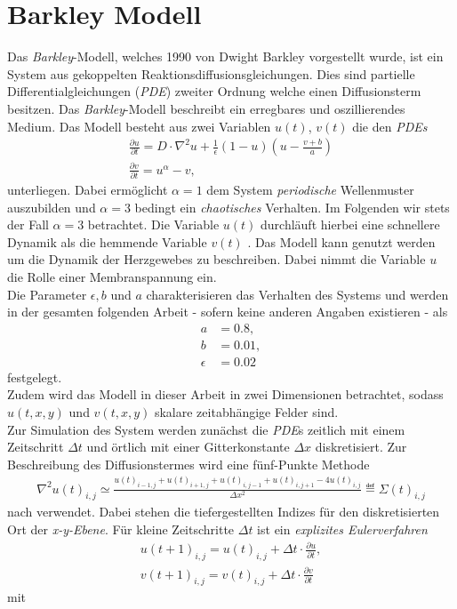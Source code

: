 \section{Barkley Modell}
Das \textit{Barkley}-Modell, welches 1990 von Dwight Barkley vorgestellt wurde, ist ein System aus gekoppelten Reaktionsdiffusionsgleichungen. Dies sind partielle Differentialgleichungen (\textit{PDE}) zweiter Ordnung welche einen Diffusionsterm besitzen. Das \textit{Barkley}-Modell beschreibt ein erregbares und oszillierendes Medium. Das Modell besteht aus zwei Variablen $u(t)$, $v(t)$ die den  \textit{PDEs}
\begin{equation}
\begin{gathered}
\frac{\partial u}{\partial t} = D \cdot \nabla^2 u + \frac{1}{\epsilon} (1-u) \left(u-\frac{v+b}{a}\right)\\
\frac{\partial v}{\partial t} = u^\alpha-v,
\end{gathered}
\end{equation}
unterliegen. Dabei ermöglicht $\alpha=1$ dem System \textit{periodische} Wellenmuster auszubilden und $\alpha=3$ bedingt ein \textit{chaotisches} Verhalten. Im Folgenden wir stets der Fall $\alpha=3$ betrachtet. Die Variable $u(t)$ durchläuft hierbei eine schnellere Dynamik als die hemmende Variable $v(t)$ \citep{Barkley:2008, berg2011synchronization}. Das Modell kann genutzt werden um die Dynamik der Herzgewebes zu beschreiben. Dabei nimmt die Variable $u$ die Rolle einer Membranspannung ein.\\
Die Parameter $\epsilon, b$ und $a$ charakterisieren das Verhalten des Systems und werden in der gesamten folgenden Arbeit - sofern keine anderen Angaben existieren - als
\begin{align*}
a &= 0.8,\\ b &= 0.01,\\ \epsilon &= 0.02
\end{align*}
festgelegt.\\
Zudem wird das Modell in dieser Arbeit in zwei Dimensionen betrachtet, sodass $u(t, x,y)$ und $v(t, x,y)$ skalare zeitabhängige Felder sind.\\
Zur Simulation des System werden zunächst die \textit{PDE}s zeitlich mit einem Zeitschritt $\Delta t$ und örtlich mit einer Gitterkonstante $\Delta x$ diskretisiert. Zur Beschreibung des Diffusionstermes wird eine fünf-Punkte Methode
\begin{align}
\nabla^2 u(t)_{i,j} \simeq \frac{u(t)_{i-1, j} + u(t)_{i+1,j} + u(t)_{i,j-1} + u(t)_{i,j+1} - 4 u(t)_{i,j}}{\Delta x^2} \eqdef \Sigma(t)_{i,j}
\end{align} 
nach \citep{Barkley:2008} verwendet. Dabei stehen die tiefergestellten Indizes für den diskretisierten Ort der \textit{x-y-Ebene}.
Für kleine Zeitschritte $\Delta t$ ist ein \textit{explizites Eulerverfahren}
\begin{equation}
\begin{gathered}
u(t+1)_{i,j} = u(t)_{i,j} + \Delta t \cdot \frac{\partial u}{\partial t},\\
v(t+1)_{i,j} = v(t)_{i,j} + \Delta t \cdot \frac{\partial v}{\partial t}
\end{gathered}
\end{equation}
mit


